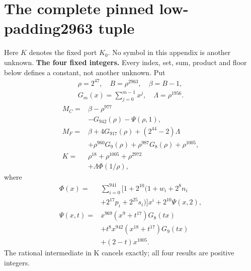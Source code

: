 \section{The complete pinned low-padding2963 tuple}
\begingroup
\providecommand{\fl}[1]{\left\lfloor#1\right\rfloor}
\providecommand{\rg}[2]{\{#1,\ldots,#2\}}
Here $K$ denotes the fixed port $K_0$. No symbol in this appendix is another unknown.
\textbf{The four fixed integers.}
Every index, set, sum, product and floor below defines a constant, not
another unknown. Put
\[
\begin{gathered}
\rho=2^{47},\quad B=\rho^{2963},\quad\beta=B-1,\\
G_m(x)=\sum_{j=0}^{m-1}x^j,\quad
\Lambda=\rho^{1956}.
\end{gathered}
\]
\begin{align*}
M_C={}&\beta-\rho^{977}\\
&-G_{942}(\rho)-\Psi(\rho,1),\\
M_F={}&\beta+4G_{917}(\rho)+(2^{44}-2)\Lambda\\
&+\rho^{960}G_9(\rho)+\rho^{987}G_8(\rho)
  +\rho^{1005},\\
K={}&\rho^{18}+\rho^{1005}+\rho^{2972}\\
&+\Lambda\Phi(1/\rho),
\end{align*}
where
\[
\begin{split}
\Phi(x)={}&\sum_{i=0}^{941}[1+2^{10}(1+w_i+2^8n_i\\
&+2^{17}p_i+2^{25}s_i)]x^i+2^{10}\Psi(x,2),\\
\Psi(x,t)={}&x^{969}(x^9+t^{17})G_8(tx)\\
&+t^8x^{942}(x^{18}+t^{17})G_9(tx)\\
&+(2-t)x^{1005}.
\end{split}
\]
The rational intermediate in K cancels exactly; all four results are positive integers.

